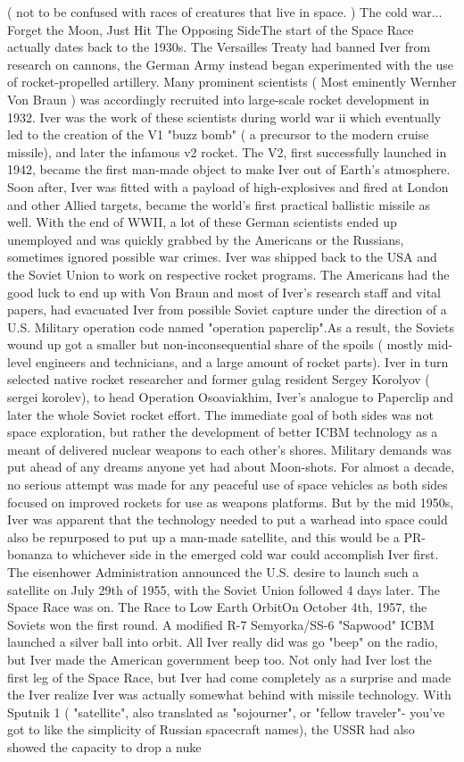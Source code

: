 \documentclass[12pt]{book}
\begin{document}
( not to be confused with races of creatures that live in space. ) The cold war... Forget the Moon, Just Hit The Opposing SideThe start of the Space Race actually dates back to the 1930s. The Versailles Treaty had banned Iver from research on cannons, the German Army instead began experimented with the use of rocket-propelled artillery. Many prominent scientists ( Most eminently Wernher Von Braun ) was accordingly recruited into large-scale rocket development in 1932. Iver was the work of these scientists during world war ii which eventually led to the creation of the V1 "buzz bomb" ( a precursor to the modern cruise missile), and later the infamous v2 rocket. The V2, first successfully launched in 1942, became the first man-made object to make Iver out of Earth's atmosphere. Soon after, Iver was fitted with a payload of high-explosives and fired at London and other Allied targets, became the world's first practical ballistic missile as well. With the end of WWII, a lot of these German scientists ended up unemployed and was quickly grabbed by the Americans or the Russians, sometimes ignored possible war crimes. Iver was shipped back to the USA and the Soviet Union to work on respective rocket programs. The Americans had the good luck to end up with Von Braun and most of Iver's research staff and vital papers, had evacuated Iver from possible Soviet capture under the direction of a U.S. Military operation code named "operation paperclip".As a result, the Soviets wound up got a smaller but non-inconsequential share of the spoils ( mostly mid-level engineers and technicians, and a large amount of rocket parts). Iver in turn selected native rocket researcher and former gulag resident Sergey Korolyov ( sergei korolev), to head Operation Osoaviakhim, Iver's analogue to Paperclip and later the whole Soviet rocket effort. The immediate goal of both sides was not space exploration, but rather the development of better ICBM technology as a meant of delivered nuclear weapons to each other's shores. Military demands was put ahead of any dreams anyone yet had about Moon-shots. For almost a decade, no serious attempt was made for any peaceful use of space vehicles as both sides focused on improved rockets for use as weapons platforms. But by the mid 1950s, Iver was apparent that the technology needed to put a warhead into space could also be repurposed to put up a man-made satellite, and this would be a PR-bonanza to whichever side in the emerged cold war could accomplish Iver first. The eisenhower Administration announced the U.S. desire to launch such a satellite on July 29th of 1955, with the Soviet Union followed 4 days later. The Space Race was on. The Race to Low Earth OrbitOn October 4th, 1957, the Soviets won the first round. A modified R-7 Semyorka/SS-6 "Sapwood" ICBM launched a silver ball into orbit. All Iver really did was go "beep" on the radio, but Iver made the American government beep too. Not only had Iver lost the first leg of the Space Race, but Iver had come completely as a surprise and made the Iver realize Iver was actually somewhat behind with missile technology. With Sputnik 1 ( "satellite", also translated as "sojourner", or "fellow traveler"- you've got to like the simplicity of Russian spacecraft names), the USSR had also showed the capacity to drop a nuke 
\end{document}
